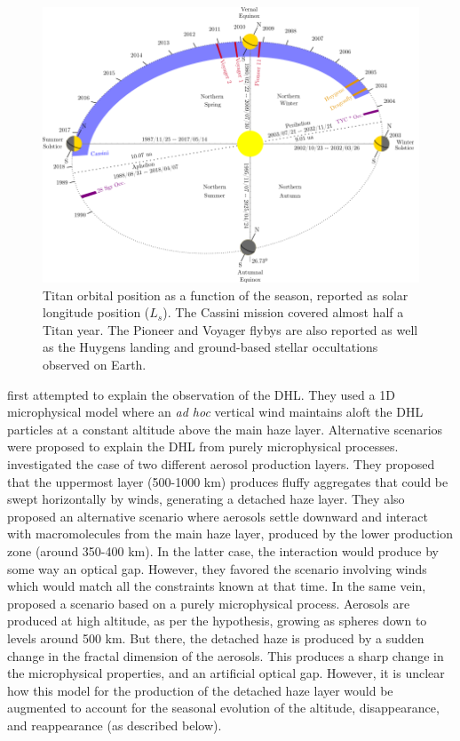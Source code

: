 \begin{figure}[!ht]
    \centering
    \includegraphics[width=\textwidth]{Fig/Titan_seasons.png}
    \caption{Titan orbital position as a function of the season, reported as solar longitude position ($L_s$).
             The Cassini mission covered almost half a Titan year. The Pioneer and Voyager flybys are also reported
             as well as the Huygens landing and ground-based stellar occultations observed on Earth.}
    \label{fig:titan_seasons}
\end{figure}

 \cite{Toon1992} first attempted to explain the observation of the DHL. They used a 1D microphysical
model where an \emph{ad hoc} vertical wind maintains aloft the DHL particles at a constant altitude above the main
haze layer. Alternative scenarios were proposed to explain the DHL from purely microphysical processes. \cite{Chassefiere1995}
investigated the case of two different aerosol production layers. They proposed that the uppermost layer (500-1000 km)
produces fluffy aggregates that could be swept horizontally by winds, generating a detached haze layer. They also
proposed an alternative scenario where aerosols settle downward and interact with macromolecules from the main haze layer,
produced by the lower production zone (around 350-400 km). In the latter case, the interaction would produce by some
way an optical gap. However, they favored the scenario involving winds which would match all the constraints
known at that time. In the same vein, \cite{Lavvas2009} proposed a scenario based on a purely microphysical process. Aerosols
are produced at high altitude, as per the \cite{Chassefiere1995} hypothesis, growing as spheres down to levels around 500 km.
But there, the detached haze is produced by a sudden change in the fractal dimension of the aerosols. This produces a
sharp change in the microphysical properties, and an artificial optical gap. However, it is unclear how this model for the
production of the detached haze layer would be augmented to account for the seasonal evolution of the altitude,
disappearance, and reappearance (as described below).

